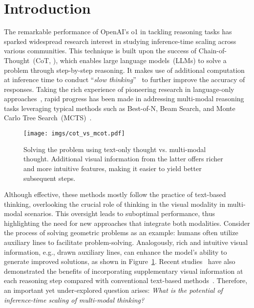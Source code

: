 \section{Introduction}

The remarkable performance of OpenAI's o1 in tackling reasoning tasks has sparked widespread research interest in studying inference-time scaling across various communities.
This technique is built upon the success of Chain-of-Thought~(CoT, \citealt{cot}), which enables large language models~(LLMs) to solve a problem through step-by-step reasoning.
It makes use of additional computation at inference time to conduct ``\textit{slow thinking}''~\cite{kahneman2011thinking} to further improve the accuracy of responses.
Taking the rich experience of pioneering research in language-only approaches~\cite{tts-mcts5,tts-mcts8,tot,scaling,tts-bs3, tts-mcts2, tts-mcts4, tree-search3, tree-search2}, rapid progress has been made in addressing multi-modal reasoning tasks leveraging typical methods such as Best-of-N, Beam Search, and Monte Carlo Tree Search~(MCTS)~\cite{xu2024llava,yao2024mulberry}.

\begin{figure}[t]
  \texttt{[image: imgs/cot\_vs\_mcot.pdf]}
  \caption{Solving the problem using text-only thought vs. multi-modal thought. Additional visual information from the latter offers richer and more intuitive features, making it easier to yield better subsequent steps.}
  \label{fig:cot-mcot}
\end{figure}

Although effective, these methods mostly follow the practice of text-based thinking, overlooking the crucial role of thinking in the visual modality in multi-modal scenarios. This oversight leads to suboptimal performance, thus highlighting the need for new approaches that integrate both modalities.
Consider the process of solving geometric problems as an example: humans often utilize auxiliary lines to facilitate problem-solving. Analogously, rich and intuitive visual information, e.g., drawn auxiliary lines, can enhance the model's ability to generate improved solutions, as shown in Figure~\ref{fig:cot-mcot}.
Recent studies~\cite{image-of-thought, vsk} have also demonstrated the benefits of incorporating supplementary visual information at each reasoning step compared with conventional text-based methods~\cite{mcot,ddcot,ccot}.
Therefore, an important yet under-explored question arises: \textit{What is the potential of inference-time scaling of multi-modal thinking?}

